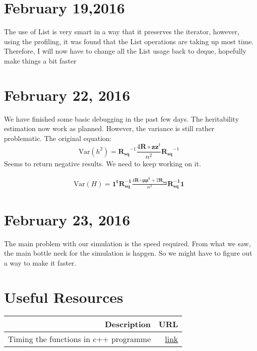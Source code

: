 \documentclass[12pt]{article}
\begin{document}
	\section{February 19,2016}
	The use of List is very smart in a way that it preserves the iterator, however, using the profiling, it was found that the List operations are taking up most time. 
	Therefore, I will now have to change all the List usage back to deque, hopefully make things a bit faster
	
	\section{February 22, 2016}
	We have finished some basic debugging in the past few days.
	The heritability estimation now work as planned.
	However, the variance is still rather problematic.
	The original equation:
	\begin{equation}
	\mathrm{Var}(h^2)=\boldsymbol{R_{sq}}^{-1}\frac{4\boldsymbol{R}\circ\boldsymbol{zz}^t}{n^2}\boldsymbol{R_{sq}}^{-1}
	\end{equation}
	Seems to return negative results. 
	We need to keep working on it.
	
	\begin{align}
	\mathrm{Var}(H) = \boldsymbol{1^tR_{sq}^{-1}}\frac{4\boldsymbol{R}\circ\boldsymbol{\mu\mu^t}+2\boldsymbol{R_{sq}}}{n^2}\boldsymbol{R_{sq}^{-1}1}
	\end{align}
	\section{February 23, 2016}
	The main problem with our simulation is the speed required. 
	From what we saw, the main bottle neck for the simulation is hapgen.
	So we might have to figure out a way to make it faster.
	\newpage
	\section{Useful Resources}
	\begin{table}[t]
		\centering
		\begin{tabular}{rr}
			\toprule
			Description & URL \\
			\midrule
			Timing the functions in c++ programme & \href{http://stackoverflow.com/a/21995693}{link}\\
			\bottomrule
		\end{tabular}
	\end{table}
\end{document}
